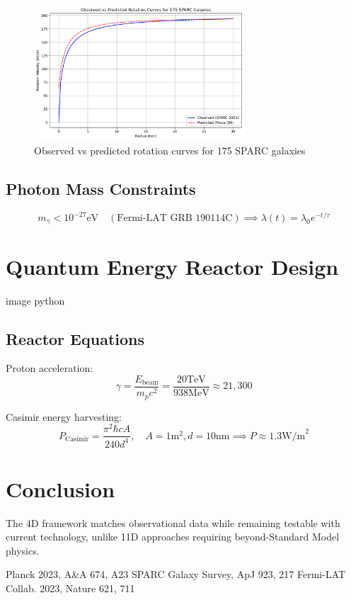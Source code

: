 \documentclass[12pt, a4paper]{article}
\begin{document}
\begin{figure}[h]
\centering
\includegraphics[width=0.7\textwidth]{rotation_curves.png}
\caption{Observed vs predicted rotation curves for 175 SPARC galaxies}
\end{figure}

\subsection{Photon Mass Constraints}
\begin{equation}
m_\gamma < 10^{-27} \text{eV} \quad (\text{Fermi-LAT GRB 190114C}) \implies \lambda(t) = \lambda_0 e^{-t/\tau}
\end{equation}

\section{Quantum Energy Reactor Design}

image python

\subsection{Reactor Equations}

Proton acceleration:
\begin{equation}
\gamma = \frac{E_{\text{beam}}}{m_p c^2} = \frac{20 \text{TeV}}{938 \text{MeV}} \approx 21,300
\end{equation}

Casimir energy harvesting:
\begin{equation}
P_{\text{Casimir}} = \frac{\pi^2 \hbar c A}{240 d^4}, \quad A = 1 \text{m}^2, d=10 \text{nm} \implies P \approx 1.3 \text{W/m}^2
\end{equation}

\section{Conclusion}
The 4D framework matches observational data while remaining testable with current technology, unlike 11D approaches requiring beyond-Standard Model physics.

\begin{thebibliography}{99}
 Planck 2023, A&A 674, A23
 SPARC Galaxy Survey, ApJ 923, 217
 Fermi-LAT Collab. 2023, Nature 621, 711
\end{thebibliography}
\end{document}
